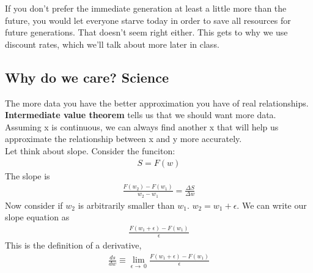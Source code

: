 \documentclass{article}
\begin{document}
If you don't prefer the immediate generation at least a little more than the future, you would let everyone starve today in order to save all resources for future generations. That doesn't seem right either. This gets to why we use discount rates, which we'll talk about more later in class. 

\subsection{Why do we care? Science}
The more data you have the better approximation you have of real relationships. \\

\textbf{Intermediate value theorem} tells us that we should want more data. Assuming x is continuous, we can always find another x that will help us approximate the relationship between x and y more accurately. \\

Let think about slope. Consider the funciton: 
\begin{align}
    S = F(w) 
\end{align}
The slope is 
\begin{align*}
    \frac{F(w_2) - F(w_1)}{w_2-w_1} = \frac{\Delta S}{ \Delta w}
\end{align*}
Now consider if $w_2$ is arbitrarily smaller than $w_1$. $w_2 = w_1 + \epsilon$. We can write our slope equation as 
\begin{align*}
    \frac{F(w_1 + \epsilon) - F(w_1)}{\epsilon}
\end{align*}
This is the definition of a derivative, 
\begin{align*}
    \frac{ds}{dw} \equiv \lim_{\epsilon \to \ 0} \frac{F(w_1 + \epsilon) - F(w_1)}{\epsilon}
\end{align*}
\end{document}
